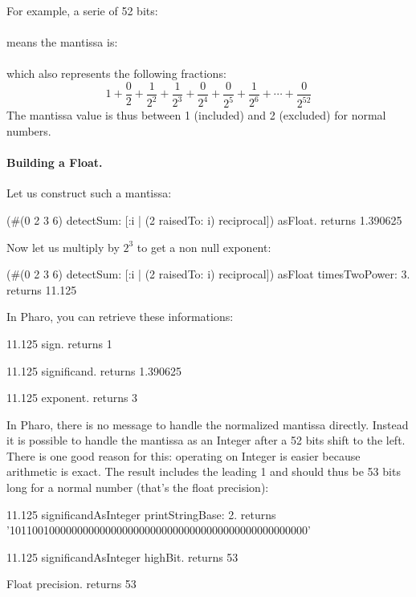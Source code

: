 \documentclass[a4paper,10pt,twoside]{book}
\begin{document}
For example, a serie of 52 bits:\\
\\
 means the mantissa is:\\
 \\
 which also represents the following fractions:  \[ 1 + \frac{0}{2} +  \frac{1}{2^2} +  \frac{1}{2^3} +  \frac{0}{2^4} +  \frac{0}{2^5} +  \frac{1}{2^6} + \cdots  +  \frac{0}{2^{52}} \]
The mantissa value is thus between 1 (included) and 2 (excluded) for normal numbers.



\paragraph{Building a Float.}
Let us construct such a mantissa:
\begin{code}{}
(#(0 2 3 6) detectSum: [:i | (2 raisedTo: i) reciprocal]) asFloat.
	returns 1.390625
\end{code}

Now let us multiply by $2^3$ to get a non null exponent:
\begin{code}{}
(#(0 2 3 6) detectSum: [:i | (2 raisedTo: i) reciprocal]) asFloat timesTwoPower: 3.
	returns 11.125
\end{code}

In Pharo, you can retrieve these informations:
 \begin{code}{}
11.125 sign.
	returns 1
	
11.125 significand.
	returns 1.390625
	
11.125 exponent.
	returns 3
\end{code}

In Pharo, there is no message to handle the normalized mantissa directly. Instead it is possible to handle the mantissa as an Integer after a 52 bits shift to the left. There is one good reason for this: operating on Integer is easier because arithmetic is exact. The result includes the leading 1 and should thus be 53 bits long for a normal number (that's the float precision):
 \begin{code}{}
11.125 significandAsInteger printStringBase: 2.
	returns '10110010000000000000000000000000000000000000000000000'
	
11.125 significandAsInteger highBit.
	returns 53
	
Float precision.
	returns 53
\end{code}
\end{document}
